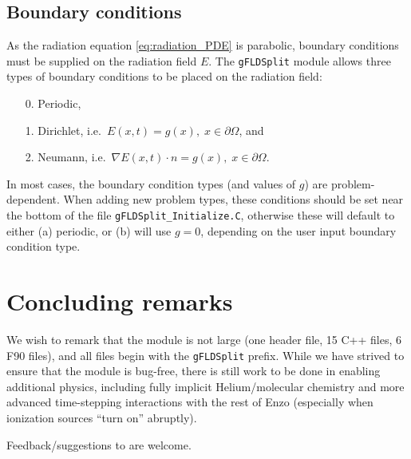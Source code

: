 \documentclass[letterpaper,10pt]{article}
\renewcommand{\(}{\left(}
\renewcommand{\)}{\right)}
\begin{document}
\subsection{Boundary conditions}
\label{sec:boundary_conditions}

As the radiation equation \eqref{eq:radiation_PDE} is parabolic,
boundary conditions must be supplied on the radiation field $E$.  The
{\tt gFLDSplit} module allows three types of boundary conditions to
be placed on the radiation field:
\begin{itemize}
\item[0.] Periodic,
\item[1.] Dirichlet, i.e.~$E(x,t) = g(x), \; x\in\partial\Omega$, and
\item[2.] Neumann, i.e.~$\nabla E(x,t)\cdot n = g(x), \; x\in\partial\Omega$.
\end{itemize}
In most cases, the boundary condition types (and values of $g$) are
problem-dependent.  When adding new problem types, these conditions
should be set near the bottom of the file {\tt gFLDSplit\_Initialize.C}, 
otherwise these will default to either (a) periodic, or (b) will use
$g=0$, depending on the user input boundary condition type.



\section{Concluding remarks}
\label{sec:conclusions}

We wish to remark that the module is not large (one header
file, 15 C++ files, 6 F90 files), and all files begin with the 
{\tt gFLDSplit} prefix.  While we have strived to ensure that the
module is bug-free, there is still work to be done in enabling
additional physics, including fully implicit Helium/molecular
chemistry and more advanced time-stepping interactions with the rest
of Enzo (especially when ionization sources ``turn on'' abruptly).  

Feedback/suggestions to are welcome.




\end{document}
